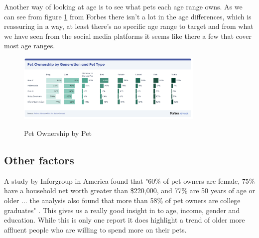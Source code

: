 \documentclass{article}
\begin{document}
Another way of looking at age is to see what pets each age range owns. As we can see from figure \ref{fig:pets} from Forbes \cite{ownersage} there isn't a lot in the age differences, which is reassuring in a way, at least there's no specific age range to target and from what we have seen from the social media platforms it seems like there a few that cover most age ranges.

\FloatBarrier
\begin{figure}[ht]
    \caption{Pet Ownership by Pet}
    \centering
    \includegraphics[width=0.8\textwidth]{OwnersByAge}
    \label{fig:pets}
    \end{figure}
    \FloatBarrier

\subsection{Other factors}
A study by Inforgroup in America found that "60\% of pet owners are female, 75\% have a household net worth greater than \$220,000, and 77\% are 50 years of age or older ... the analysis also found that more than 58\% of pet owners are college graduates" \cite{data}. This gives us a really good insight in to age, income, gender and education. While this is only one report it does highlight a trend of older more affluent people who are willing to spend more on their pets.

\bigskip

\end{document}
